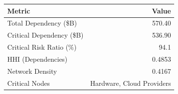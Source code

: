 

\begin{tabular}{@{}lr@{}}
\toprule
Metric & Value \\
\midrule
Total Dependency (\$B) & 570.40 \\
Critical Dependency (\$B) & 536.90 \\
Critical Risk Ratio (\%) & 94.1 \\
HHI (Dependencies) & 0.4853 \\
Network Density & 0.4167 \\
Critical Nodes & Hardware, Cloud Providers \\
\bottomrule
\end{tabular}